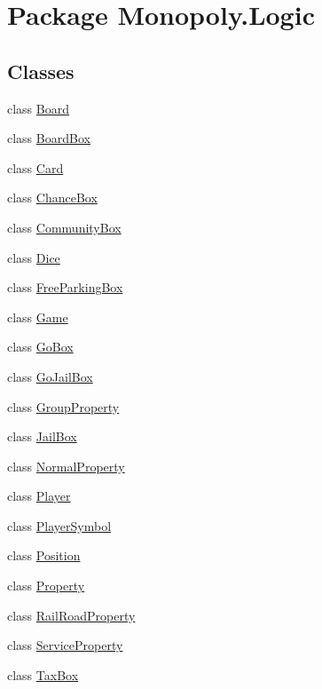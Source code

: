 \hypertarget{namespace_monopoly_1_1_logic}{}\section{Package Monopoly.\+Logic}
\label{namespace_monopoly_1_1_logic}
\subsection*{Classes}
\begin{DoxyCompactItemize}
\item 
class \hyperlink{class_monopoly_1_1_logic_1_1_board}{Board}
\item 
class \hyperlink{class_monopoly_1_1_logic_1_1_board_box}{Board\+Box}
\item 
class \hyperlink{class_monopoly_1_1_logic_1_1_card}{Card}
\item 
class \hyperlink{class_monopoly_1_1_logic_1_1_chance_box}{Chance\+Box}
\item 
class \hyperlink{class_monopoly_1_1_logic_1_1_community_box}{Community\+Box}
\item 
class \hyperlink{class_monopoly_1_1_logic_1_1_dice}{Dice}
\item 
class \hyperlink{class_monopoly_1_1_logic_1_1_free_parking_box}{Free\+Parking\+Box}
\item 
class \hyperlink{class_monopoly_1_1_logic_1_1_game}{Game}
\item 
class \hyperlink{class_monopoly_1_1_logic_1_1_go_box}{Go\+Box}
\item 
class \hyperlink{class_monopoly_1_1_logic_1_1_go_jail_box}{Go\+Jail\+Box}
\item 
class \hyperlink{class_monopoly_1_1_logic_1_1_group_property}{Group\+Property}
\item 
class \hyperlink{class_monopoly_1_1_logic_1_1_jail_box}{Jail\+Box}
\item 
class \hyperlink{class_monopoly_1_1_logic_1_1_normal_property}{Normal\+Property}
\item 
class \hyperlink{class_monopoly_1_1_logic_1_1_player}{Player}
\item 
class \hyperlink{class_monopoly_1_1_logic_1_1_player_symbol}{Player\+Symbol}
\item 
class \hyperlink{class_monopoly_1_1_logic_1_1_position}{Position}
\item 
class \hyperlink{class_monopoly_1_1_logic_1_1_property}{Property}
\item 
class \hyperlink{class_monopoly_1_1_logic_1_1_rail_road_property}{Rail\+Road\+Property}
\item 
class \hyperlink{class_monopoly_1_1_logic_1_1_service_property}{Service\+Property}
\item 
class \hyperlink{class_monopoly_1_1_logic_1_1_tax_box}{Tax\+Box}
\end{DoxyCompactItemize}
